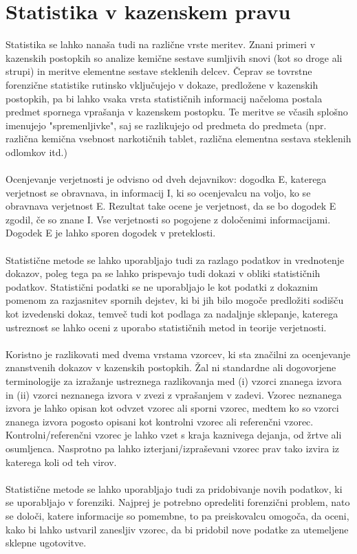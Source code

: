 \documentclass[12pt,a4paper]{amsart}
\theoremstyle{definition} %
\theoremstyle{plain} %
\begin{document}
\section{Statistika v kazenskem pravu}
Statistika se lahko nanaša tudi na različne vrste meritev. Znani primeri v kazenskih postopkih so analize kemične sestave sumljivih snovi (kot so droge ali strupi) in meritve elementne sestave steklenih delcev. Čeprav se tovrstne forenzične statistike 
rutinsko vključujejo v dokaze, predložene v kazenskih postopkih, pa bi lahko vsaka vrsta statističnih informacij načeloma postala predmet spornega vprašanja v kazenskem postopku. Te meritve se včasih splošno imenujejo "spremenljivke", saj se razlikujejo 
od predmeta do predmeta (npr. različna kemična vsebnost narkotičnih tablet, različna elementna sestava steklenih odlomkov itd.)\\\\
Ocenjevanje verjetnosti je odvisno od dveh dejavnikov: dogodka E, katerega verjetnost se obravnava, in informacij I, ki so ocenjevalcu na voljo, ko se obravnava verjetnost E. Rezultat take ocene je verjetnost, da se bo dogodek E zgodil, če so znane I. 
Vse verjetnosti so pogojene z določenimi informacijami. Dogodek E je lahko sporen dogodek v preteklosti.\\\\
Statistične metode se lahko uporabljajo tudi za razlago podatkov in vrednotenje dokazov, poleg tega pa se lahko prispevajo tudi dokazi v obliki statističnih podatkov. Statistični podatki se ne uporabljajo le kot podatki z dokaznim pomenom za razjasnitev 
spornih dejstev, ki bi jih bilo mogoče predložiti sodišču kot izvedenski dokaz, temveč tudi kot podlaga za nadaljnje sklepanje, katerega ustreznost se lahko oceni z uporabo statističnih metod in teorije verjetnosti.\\\\
Koristno je razlikovati med dvema vrstama vzorcev, ki sta značilni za ocenjevanje znanstvenih dokazov v kazenskih postopkih. Žal ni standardne ali dogovorjene terminologije za izražanje ustreznega razlikovanja med (i) vzorci znanega izvora in (ii) vzorci 
neznanega izvora v zvezi z vprašanjem v zadevi. Vzorec neznanega izvora je lahko opisan kot odvzet vzorec ali sporni vzorec, medtem ko so vzorci znanega izvora pogosto opisani kot kontrolni vzorec ali referenčni vzorec. Kontrolni/referenčni vzorec je lahko 
vzet s kraja kaznivega dejanja, od žrtve ali osumljenca. Nasprotno pa lahko izterjani/izpraševani vzorec prav tako izvira iz katerega koli od teh virov.\\\\
Statistične metode se lahko uporabljajo tudi za pridobivanje novih podatkov, ki se uporabljajo v forenziki. Najprej je potrebno opredeliti forenzični problem, nato se določi, katere informacije so pomembne, to pa preiskovalcu omogoča, da oceni, kako bi lahko 
ustvaril zanesljiv vzorec, da bi pridobil nove podatke za utemeljene sklepne ugotovitve.
\end{document}
